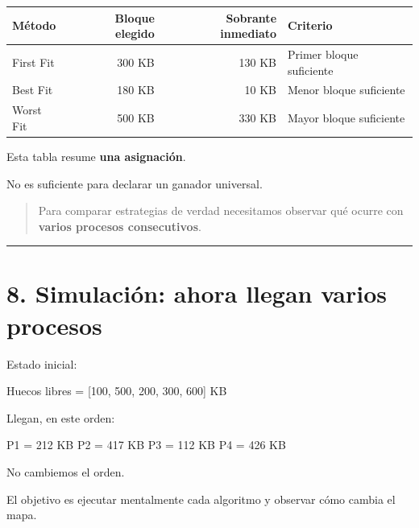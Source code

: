 \documentclass[
  spanish,
  letterpaper,
]{scrbook}
\newenvironment{Shaded}{\begin{snugshade}}{\end{snugshade}}
\newcommand{\NormalTok}[1]{\textcolor[rgb]{0.00,0.23,0.31}{#1}}
\newcounter{none} %
\begin{document}
{\def\LTcaptype{none} %
\begin{longtable}[]{@{}lrrl@{}}
\toprule\noalign{}
Método & Bloque elegido & Sobrante inmediato & Criterio \\
\midrule\noalign{}
\endhead
\bottomrule\noalign{}
\endlastfoot
First Fit & 300 KB & 130 KB & Primer bloque suficiente \\
Best Fit & 180 KB & 10 KB & Menor bloque suficiente \\
Worst Fit & 500 KB & 330 KB & Mayor bloque suficiente \\
\end{longtable}
}

Esta tabla resume \textbf{una asignación}.

No es suficiente para declarar un ganador universal.

\begin{quote}
Para comparar estrategias de verdad necesitamos observar qué ocurre con
\textbf{varios procesos consecutivos}.
\end{quote}

\begin{center}\rule{0.5\linewidth}{0.5pt}\end{center}


\chapter{8. Simulación: ahora llegan varios
procesos}\label{simulaciuxf3n-ahora-llegan-varios-procesos-1}

Estado inicial:

\begin{Shaded}
\begin{Highlighting}[]
\NormalTok{Huecos libres = [100, 500, 200, 300, 600] KB}
\end{Highlighting}
\end{Shaded}

Llegan, en este orden:

\begin{Shaded}
\begin{Highlighting}[]
\NormalTok{P1 = 212 KB}
\NormalTok{P2 = 417 KB}
\NormalTok{P3 = 112 KB}
\NormalTok{P4 = 426 KB}
\end{Highlighting}
\end{Shaded}

No cambiemos el orden.

El objetivo es ejecutar mentalmente cada algoritmo y observar cómo
cambia el mapa.
\end{document}
